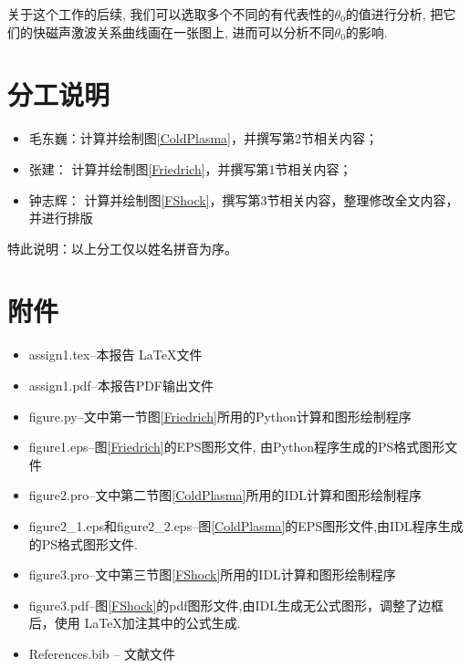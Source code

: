 \documentclass{article}
\begin{document}
	关于这个工作的后续, 我们可以选取多个不同的有代表性的$\theta_0$的值进行分析, 把它们的快磁声激波关系曲线画在一张图上, 进而可以分析不同$\theta_0$的影响.

	\section{分工说明}
	
	\begin{itemize}
		\item 毛东巍：计算并绘制图\ref{ColdPlasma}，并撰写第2节相关内容；
		\item 张建： 计算并绘制图\ref{Friedrich}，并撰写第1节相关内容；
		\item 钟志辉： 计算并绘制图\ref{FShock}，撰写第3节相关内容，整理修改全文内容，并进行排版
	\end{itemize}
	特此说明：以上分工仅以姓名拼音为序。
	
	\section{附件}
	
	\begin{itemize}
		\item
		assign1.tex--本报告 \LaTeX 文件
		\item
		assign1.pdf--本报告PDF输出文件
		\item
		figure.py--文中第一节图\ref{Friedrich}所用的Python计算和图形绘制程序
		\item
		figure1.eps--图\ref{Friedrich}的EPS图形文件, 由Python程序生成的PS格式图形文件
		\item
		figure2.pro--文中第二节图\ref{ColdPlasma}所用的IDL计算和图形绘制程序
		\item
		figure2\_1.eps和figure2\_2.eps--图\ref{ColdPlasma}的EPS图形文件,由IDL程序生成的PS格式图形文件.
		\item
		figure3.pro--文中第三节图\ref{FShock}所用的IDL计算和图形绘制程序
		\item
		figure3.pdf--图\ref{FShock}的pdf图形文件,由IDL生成无公式图形，调整了边框后，使用
		\LaTeX 加注其中的公式生成.
		\item
		References.bib -- 文献文件
	\end{itemize}

	
	
	
	
\end{document}
